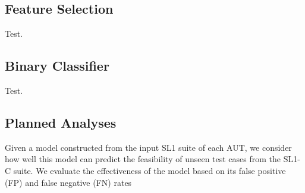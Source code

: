 \subsection{ Feature Selection }

Test.

\subsection{ Binary Classifier }

Test.

\subsection{ Planned Analyses }

Given a model constructed from the input SL1 suite of each AUT, we consider how well this model can predict the
feasibility of unseen test cases from the SL1-C suite. We evaluate the effectiveness of the model based on its
false positive (FP) and false negative (FN) rates

